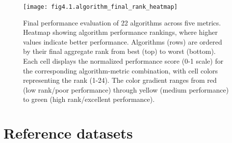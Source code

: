 \begin{figure}[htbp]
    \centering
    \texttt{[image: fig4.1.algorithm\_final\_rank\_heatmap]}
    \caption[Final performance evaluation of 22 algorithms across five metrics.]{Final performance evaluation of 22 algorithms across five metrics. Heatmap showing algorithm performance rankings, where higher values indicate better performance. Algorithms (rows) are ordered by their final aggregate rank from best (top) to worst (bottom). Each cell displays the normalized performance score (0-1 scale) for the corresponding algorithm-metric combination, with cell colors representing the rank (1-24). The color gradient ranges from red (low rank/poor performance) through yellow (medium performance) to green (high rank/excellent performance). }
    \label{fig:fig4.1.algorithm_final_rank_heatmap}
\end{figure}


\section{Reference datasets} %
\label{sec:reference_datasets_results}

